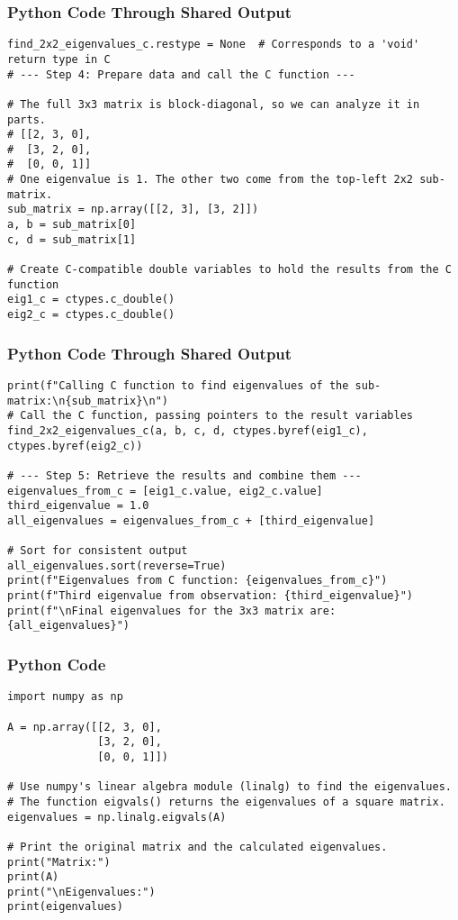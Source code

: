 \documentclass{beamer}
\begin{document}
\begin{frame}[fragile]
\frametitle{Python Code Through Shared Output }
\begin{lstlisting}
find_2x2_eigenvalues_c.restype = None  # Corresponds to a 'void' return type in C
# --- Step 4: Prepare data and call the C function ---

# The full 3x3 matrix is block-diagonal, so we can analyze it in parts.
# [[2, 3, 0],
#  [3, 2, 0],
#  [0, 0, 1]]
# One eigenvalue is 1. The other two come from the top-left 2x2 sub-matrix.
sub_matrix = np.array([[2, 3], [3, 2]])
a, b = sub_matrix[0]
c, d = sub_matrix[1]

# Create C-compatible double variables to hold the results from the C function
eig1_c = ctypes.c_double()
eig2_c = ctypes.c_double()
\end{lstlisting}    
\end{frame}
\begin{frame}[fragile]
\frametitle{Python Code Through Shared Output }
\begin{lstlisting}
print(f"Calling C function to find eigenvalues of the sub-matrix:\n{sub_matrix}\n")
# Call the C function, passing pointers to the result variables
find_2x2_eigenvalues_c(a, b, c, d, ctypes.byref(eig1_c), ctypes.byref(eig2_c))

# --- Step 5: Retrieve the results and combine them ---
eigenvalues_from_c = [eig1_c.value, eig2_c.value]
third_eigenvalue = 1.0
all_eigenvalues = eigenvalues_from_c + [third_eigenvalue]

# Sort for consistent output
all_eigenvalues.sort(reverse=True)
print(f"Eigenvalues from C function: {eigenvalues_from_c}")
print(f"Third eigenvalue from observation: {third_eigenvalue}")
print(f"\nFinal eigenvalues for the 3x3 matrix are: {all_eigenvalues}")
\end{lstlisting}    
\end{frame}
\begin{frame}[fragile]
\frametitle{Python Code}
\begin{lstlisting}
import numpy as np

A = np.array([[2, 3, 0],
              [3, 2, 0],
              [0, 0, 1]])

# Use numpy's linear algebra module (linalg) to find the eigenvalues.
# The function eigvals() returns the eigenvalues of a square matrix.
eigenvalues = np.linalg.eigvals(A)

# Print the original matrix and the calculated eigenvalues.
print("Matrix:")
print(A)
print("\nEigenvalues:")
print(eigenvalues)
\end{lstlisting}
\end{frame}
\end{document}

